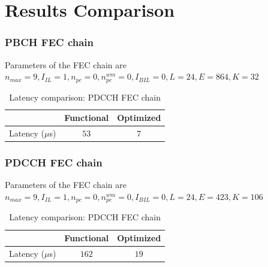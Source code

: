 \section{Results Comparison}

\subsubsection{PBCH FEC chain}
Parameters of the FEC chain are \newline
$n_{max} = 9, I_{IL} = 1, n_{pc} = 0, n_{pc}^{wm} = 0, I_{BIL} = 0, L = 24, E = 864, K = 32$
\begin{table}[!h]
	\begin{center}
		\caption{Latency comparison: PDCCH FEC chain}
		\label{tab:pbchFecChain}
		\begin{tabular}{c|c|c} %
			\textbf{ } & Functional & Optimized \\
			\hline
			Latency ($\mu$s) & $53$ & $7$\\
		\end{tabular}
	\end{center}
\end{table}

\subsubsection{PDCCH FEC chain}
Parameters of the FEC chain are \newline
$n_{max} = 9, I_{IL} = 1, n_{pc} = 0, n_{pc}^{wm} = 0, I_{BIL} = 0, L = 24, E = 423, K = 106$
\begin{table}[!h]
	\begin{center}
		\caption{Latency comparison: PDCCH FEC chain}
		\label{tab:pdcchFecChain}
		\begin{tabular}{c|c|c} %
			\textbf{ } & Functional & Optimized \\
			\hline
			Latency ($\mu$s) & $162$ & $19$\\
		\end{tabular}
	\end{center}
\end{table}


